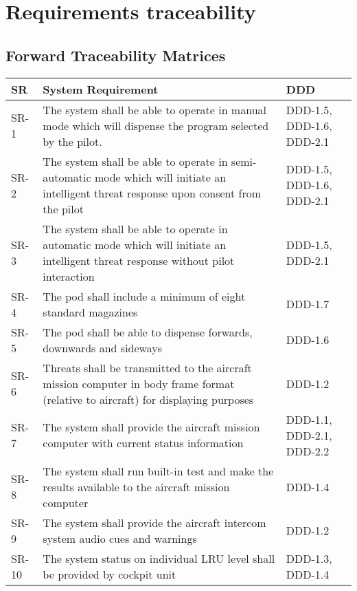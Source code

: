\documentclass[Main]{subfiles}
\begin{document}
\chapter{Requirements traceability}


\section{Forward Traceability Matrices}


\begin{longtable}{p{} p{} p{}} \hline
SR & System Requirement & DDD \\\hline

SR-1 & The system shall be able to operate in manual mode which will dispense the program selected by the pilot. & DDD-1.5, DDD-1.6, DDD-2.1 \\

SR-2 & The system shall be able to operate in semi-automatic mode which will initiate an intelligent threat response upon consent from the pilot & DDD-1.5, DDD-1.6, DDD-2.1 \\

SR-3 & The system shall be able to operate in automatic mode which will initiate an intelligent threat response without pilot interaction & DDD-1.5, DDD-2.1 \\

SR-4 & The pod shall include a minimum of eight standard magazines & DDD-1.7 \\

SR-5 & The pod shall be able to dispense forwards, downwards and sideways & DDD-1.6 \\

SR-6 & Threats shall be transmitted to the aircraft mission computer in body frame format (relative to aircraft) for displaying purposes &  DDD-1.2\\

SR-7 & The system shall provide the aircraft mission computer with current status information & DDD-1.1, DDD-2.1, DDD-2.2 \\

SR-8 &  The system shall run built-in test and make the results available to the aircraft mission computer & DDD-1.4 \\

SR-9 & The system shall provide the aircraft intercom system audio cues and warnings & DDD-1.2 \\

SR-10 &  The system status on individual LRU level shall be provided by cockpit unit & DDD-1.3, DDD-1.4 \\


\end{longtable}
\end{document}
